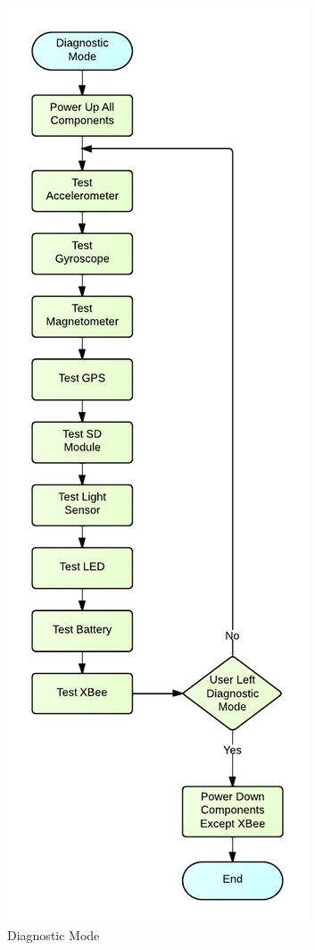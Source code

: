 \begin{figure}[H]
	\centering
	\includegraphics[scale=1.0]{img/DiagnosticMode.pdf}
	\caption{Diagnostic Mode \label{fig:diagnosticMode}}
\end{figure}


